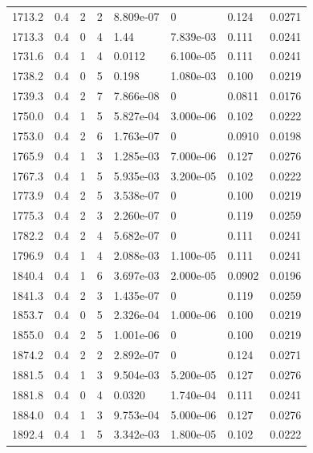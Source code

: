 \documentclass[preview]{standalone}
\begin{document}
{{{{\begin{tabular}{L{1.2cm}C{1.2cm} C{0.3cm}C{0.5cm} C{1.4cm}C{1.4cm} C{1.4cm}C{1.4cm}}
  1713.2  &   0.4  & 2     &  2 &  8.809e-07  & 0  & 0.124 &  0.0271   \\ 
  1713.3  &   0.4  & 0     &  4 &  1.44  & 7.839e-03  & 0.111 &  0.0241   \\ 
  1731.6  &   0.4  & 1     &  4 &  0.0112  & 6.100e-05  & 0.111 &  0.0241   \\ 
  1738.2  &   0.4  & 0     &  5 &  0.198  & 1.080e-03  & 0.100 &  0.0219   \\ 
  1739.3  &   0.4  & 2     &  7 &  7.866e-08  & 0  & 0.0811 &  0.0176   \\ 
  1750.0  &   0.4  & 1     &  5 &  5.827e-04  & 3.000e-06  & 0.102 &  0.0222   \\ 
  1753.0  &   0.4  & 2     &  6 &  1.763e-07  & 0  & 0.0910 &  0.0198   \\ 
  1765.9  &   0.4  & 1     &  3 &  1.285e-03  & 7.000e-06  & 0.127 &  0.0276   \\ 
  1767.3  &   0.4  & 1     &  5 &  5.935e-03  & 3.200e-05  & 0.102 &  0.0222   \\ 
  1773.9  &   0.4  & 2     &  5 &  3.538e-07  & 0  & 0.100 &  0.0219   \\ 
  1775.3  &   0.4  & 2     &  3 &  2.260e-07  & 0  & 0.119 &  0.0259   \\ 
  1782.2  &   0.4  & 2     &  4 &  5.682e-07  & 0  & 0.111 &  0.0241   \\ 
  1796.9  &   0.4  & 1     &  4 &  2.088e-03  & 1.100e-05  & 0.111 &  0.0241   \\ 
  1840.4  &   0.4  & 1     &  6 &  3.697e-03  & 2.000e-05  & 0.0902 &  0.0196   \\ 
  1841.3  &   0.4  & 2     &  3 &  1.435e-07  & 0  & 0.119 &  0.0259   \\ 
  1853.7  &   0.4  & 0     &  5 &  2.326e-04  & 1.000e-06  & 0.100 &  0.0219   \\ 
  1855.0  &   0.4  & 2     &  5 &  1.001e-06  & 0  & 0.100 &  0.0219   \\ 
  1874.2  &   0.4  & 2     &  2 &  2.892e-07  & 0  & 0.124 &  0.0271   \\ 
  1881.5  &   0.4  & 1     &  3 &  9.504e-03  & 5.200e-05  & 0.127 &  0.0276   \\ 
  1881.8  &   0.4  & 0     &  4 &  0.0320  & 1.740e-04  & 0.111 &  0.0241   \\ 
  1884.0  &   0.4  & 1     &  3 &  9.753e-04  & 5.000e-06  & 0.127 &  0.0276   \\ 
  1892.4  &   0.4  & 1     &  5 &  3.342e-03  & 1.800e-05  & 0.102 &  0.0222   \\ 

\end{tabular}}}}}
\end{document}

